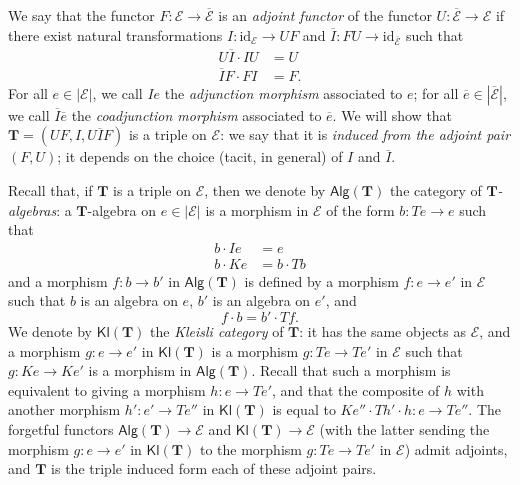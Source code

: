\documentclass{article}
\newcommand{\oldpage}[1]{\marginpar{\footnotesize$\Big\vert$ \textit{p.~#1}}}
\newcommand{\id}{\mathrm{id}}
\newcommand{\TT}{\mathbf{T}}
\newcommand{\cat}[1]{\mathcal{#1}}
\newcommand{\Cat}[1]{\mathsf{#1}}
\newcommand{\set}[1]{|#1|}
\newcommand{\Alg}[1]{\Cat{Alg}(#1)}
\newcommand{\Kl}[1]{\Cat{Kl}(#1)}
\begin{document}
We say that the functor $F\colon\cat{E}\to\overline{\cat{E}}$ is an \emph{adjoint functor} of the functor $U\colon\overline{\cat{E}}\to\cat{E}$ if there exist natural transformations $I\colon\id_\cat{E}\to UF$ and $\overline{I}\colon FU\to\id_{\overline{\cat{E}}}$ such that
\[
  \begin{aligned}
    U\overline{I}\cdot IU
  & = U
  \\\overline{I}F\cdot FI
  & = F.
  \end{aligned}
  \tag{3}
\]
For all $e\in\set{\cat{E}}$, we call $Ie$ the \emph{adjunction morphism} associated to $e$; for all $\overline{e}\in\set{\overline{\cat{E}}}$, we call $\overline{I}\overline{e}$ the \emph{coadjunction morphism} associated to $\overline{e}$.
We will show that $\TT=(UF,I,U\overline{I}F)$ is a triple on $\cat{E}$: we say that it is \emph{induced from the adjoint pair $(F,U)$};
it depends on the choice (tacit, in general) of $I$ and $\overline{I}$.

Recall that, if $\TT$ is a triple on $\cat{E}$, then we denote by $\Alg{\TT}$ the category of \emph{$\TT$-algebras}: a $\TT$-algebra on $e\in{\set{\cat{E}}}$ is a morphism in $\cat{E}$ of the form $b\colon Te\to e$ such that
\[
  \begin{aligned}
    b\cdot Ie
    &= e
  \\b\cdot Ke
    &= b\cdot Tb
  \end{aligned}
  \tag{4}
\]
and a morphism $f\colon b\to b'$ in $\Alg{\TT}$ is defined by a morphism $f\colon e\to e'$ in $\cat{E}$ such that $b$ is an algebra on $e$, $b'$ is an algebra on $e'$, and
\[
  f\cdot b
  = b'\cdot Tf.
  \tag{5}
\]
We denote by $\Kl{\TT}$ the \emph{Kleisli category} of $\TT$: it has the same objects as $\cat{E}$, and a morphism $g\colon e\to e'$ in $\Kl{\TT}$ is a morphism $g\colon Te\to Te'$ in $\cat{E}$ such that $g\colon Ke\to Ke'$ is a morphism in $\Alg{\TT}$.
\oldpage{224}
Recall that such a morphism is equivalent to giving a morphism $h\colon e\to Te'$, and that the composite of $h$ with another morphism $h'\colon e'\to Te''$ in $\Kl{\TT}$ is equal to $Ke''\cdot Th'\cdot h\colon e\to Te''$.
The forgetful functors $\Alg{\TT}\to\cat{E}$ and $\Kl{\TT}\to\cat{E}$ (with the latter sending the morphism $g\colon e\to e'$ in $\Kl{\TT}$ to the morphism $g\colon Te\to Te'$ in $\cat{E}$) admit adjoints, and $\TT$ is the triple induced form each of these adjoint pairs.
\end{document}
